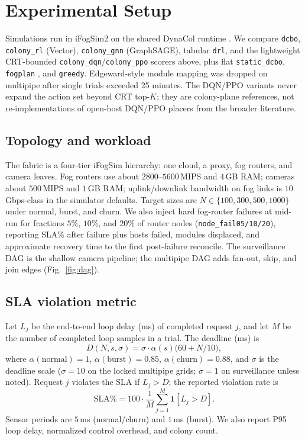 \documentclass[11pt,a4paper]{article}
\begin{document}
\section{Experimental Setup}
\label{sec:setup}

Simulations run in iFogSim2 on the shared DynaCol runtime
\cite{gupta_ifogsim2017,mahmud_ifogsim2_jss2022}.
We compare \texttt{dcbo}, \texttt{colony\_rl} (Vector),
\texttt{colony\_gnn} (GraphSAGE), tabular \texttt{drl}, and the lightweight
CRT-bounded \texttt{colony\_dqn}/\texttt{colony\_ppo} scorers above, plus flat
\texttt{static\_dcbo}, \texttt{fogplan} \cite{yousefpour_fogplan_jiot2019}, and
\texttt{greedy}. Edgeward-style module mapping
\cite{taneja_im2017_edgeward} was dropped on multipipe after single trials
exceeded 25 minutes. The DQN/PPO variants never expand the action set beyond
CRT top-$K$; they are colony-plane references, not re-implementations of
open-host DQN/PPO placers from the broader literature.

\subsection{Topology and workload}
The fabric is a four-tier iFogSim hierarchy: one cloud, a proxy, fog routers, and
camera leaves. Fog routers use about $2800$--$5600$\,MIPS and $4$\,GB RAM; cameras
about $500$\,MIPS and $1$\,GB RAM; uplink/downlink bandwidth on fog links is
$10$\,Gbps-class in the simulator defaults. Target sizes are
$N\in\{100,300,500,1000\}$ under normal, burst, and churn. We also inject hard
fog-router failures at mid-run for fractions $5\%$, $10\%$, and $20\%$ of
router nodes (\texttt{node\_fail05/10/20}), reporting SLA\% after failure plus
hosts failed, modules displaced, and approximate recovery time to the first
post-failure reconcile. The surveillance DAG
is the shallow camera pipeline; the multipipe DAG adds fan-out, skip, and join
edges (Fig.~\ref{fig:dag}).

\subsection{SLA violation metric}
\label{sec:sla}
Let $L_j$ be the end-to-end loop delay (ms) of completed request $j$, and let
$M$ be the number of completed loop samples in a trial. The deadline (ms) is
\begin{equation}
D(N,s,\sigma)=\sigma\cdot\alpha(s)\bigl(60+N/10\bigr),
\label{eq:deadline}
\end{equation}
where $\alpha(\mathrm{normal}){=}1$, $\alpha(\mathrm{burst}){=}0.85$,
$\alpha(\mathrm{churn}){=}0.88$, and $\sigma$ is the deadline scale
($\sigma{=}10$ on the locked multipipe grids; $\sigma{=}1$ on surveillance unless
noted). Request $j$ violates the SLA if $L_j>D$; the reported violation rate is
\begin{equation}
\mathrm{SLA\%}=100\cdot\frac{1}{M}\sum_{j=1}^{M}\mathbf{1}[L_j>D].
\label{eq:slaviol}
\end{equation}
Sensor periods are $5$\,ms (normal/churn) and $1$\,ms (burst). We also report
P95 loop delay, normalized control overhead, and colony count.
\end{document}
